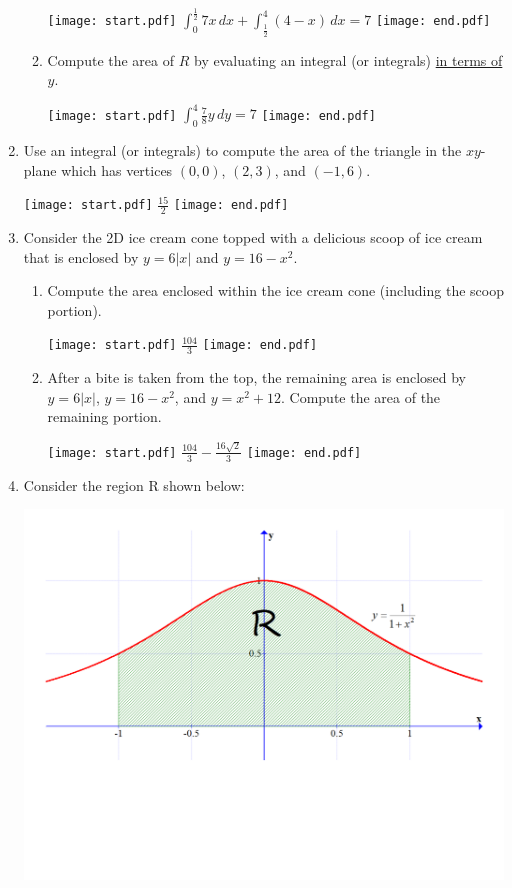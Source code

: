 \documentclass[12pt]{article}
\begin{document}
\begin{enumerate}
\begin{enumerate}
\texttt{[image: start.pdf]}
{{$\int_{0}^{\frac{1}{2}} 7x \,dx + \int_{\frac{1}{2}}^4 (4-x) \,dx= 7$}}
\texttt{[image: end.pdf]}


\item Compute the area of $R$ by evaluating an integral (or integrals) \underline{in terms of $y$}.

\texttt{[image: start.pdf]}
{{$\int_0^4 \frac{7}{8}y \,dy=7$}}
\texttt{[image: end.pdf]}


\end{enumerate}

\item Use an integral (or integrals) to compute the area of the triangle in the $xy$-plane which has vertices $(0,0)$, $(2,3)$, and $(-1,6)$.

\texttt{[image: start.pdf]}
{{$\frac{15}{2}$}}
\texttt{[image: end.pdf]}


\item Consider the 2D ice cream cone topped with a delicious scoop of ice cream that is enclosed by $y=6|x|$ and $y=16-x^2$.

\begin{enumerate}

\item Compute the area enclosed within the ice cream cone (including the scoop portion).

\texttt{[image: start.pdf]}
{{$\frac{104}{3}$}}
\texttt{[image: end.pdf]}


\item After a bite is taken from the top, the remaining area is enclosed by $y=6|x|$, $y=16-x^2$, and $y=x^2+12$.  Compute the area of the remaining portion.

\texttt{[image: start.pdf]}
{{$\frac{104}{3}-\frac{16\sqrt{2}}{3}$}}
\texttt{[image: end.pdf]}


\end{enumerate}

\item Consider the region R shown below:

\begin{center}

\includegraphics[scale=0.3]{area.pdf}


\end{center}
\end{enumerate}
\end{document}
